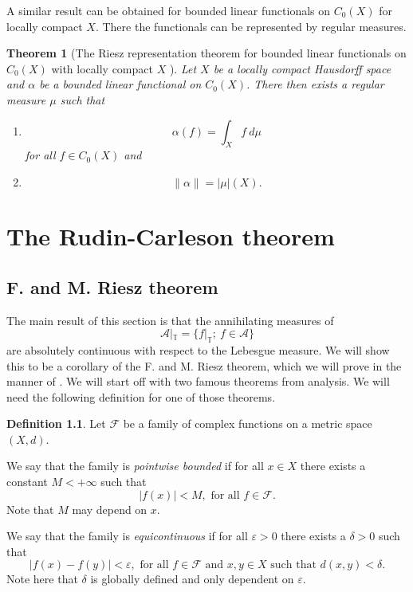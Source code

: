 \documentclass[a4paper,12pt,twoside,BCOR=10mm]{scrbook}
\newtheorem{theorem}{Theorem}[section]
\theoremstyle{definition}
\theoremstyle{definition}
\theoremstyle{definition}
\newtheorem{definition}[theorem]{Definition}
\begin{document}
A similar result can be obtained for bounded linear functionals on $C_0(X)$ for locally compact $X$.
There the functionals can be represented by regular measures.
\begin{theorem}[The Riesz representation theorem for bounded linear functionals on $C_0(X)$ with locally compact $X$ \citep{rudin2}]
\label{riesz}
Let $X$ be a locally compact Hausdorff space and $\alpha$ be a bounded linear functional on $C_0(X)$.
There then exists a regular measure $\mu$ such that
\begin{enumerate}
\item[\emph{(i)}]
\[
	\alpha(f) = \int_X f\ d\mu
\]
for all $f \in C_0(X)$ and
\item[\emph{(ii)}]
\[
	\|\alpha\| = |\mu|(X).
\]
\end{enumerate}
\end{theorem}




\chapter{The Rudin-Carleson theorem}
\section{F. and M. Riesz theorem}
\label{section1}
The main result of this section is that the annihilating measures of 
\[
\label{index17}
	\mathcal{A}|_{\mathbb{T}} = \{f|_{\mathbb{T}};\ f \in \mathcal{A}\}
\]
are absolutely continuous with respect to the Lebesgue measure.
We will show this to be a corollary of the F. and M. Riesz theorem, which we will prove in the manner of \citep{rudin2}.
We will start off with two famous theorems from analysis. 
We will need the following definition for one of those theorems.
\begin{definition}
\label{index18}
Let $\mathcal{F}$ be a family of complex functions on a metric space $(X, d)$.

We say that the family is \emph{pointwise bounded} if for all $x \in X$ there exists a constant $M < +\infty$ such that
\[
	|f(x)| < M,\text{ for all } f \in \mathcal{F}.
\]
Note that $M$ may depend on $x$.

We say that the family is \emph{equicontinuous} if for all $\varepsilon > 0$ there exists a $\delta > 0$ such that
\[
	|f(x) - f(y)| < \varepsilon,\text{ for all } f \in \mathcal{F}\text{ and } x, y \in X\text{ such that } d(x, y) < \delta.
\]
Note here that $\delta$ is globally defined and only dependent on $\varepsilon$.
\end{definition}
\end{document}
